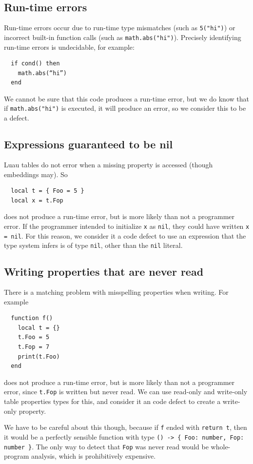 \documentclass[sigplan]{acmart}
\begin{document}
\subsection{Run-time errors}

Run-time errors occur due to run-time type mismatches (such as \verb|5("hi")|)
or incorrect built-in function calls (such as \verb|math.abs("hi")|).
Precisely identifying run-time errors is undecidable, for example:
\begin{verbatim}
  if cond() then
    math.abs(“hi”)
  end
\end{verbatim}
We cannot be sure that this code produces a run-time
error, but we do know that if \verb|math.abs("hi")| is executed, it
will produce an error, so we consider this to be a defect.

\subsection{Expressions guaranteed to be nil}

Luau tables do not error when a missing property is accessed (though embeddings may). So
\begin{verbatim}
  local t = { Foo = 5 }
  local x = t.Fop
\end{verbatim}
does not produce a run-time error, but is more likely than not a
programmer error. If the programmer intended to
initialize \verb|x| as \verb|nil|, they could have written
\verb|x = nil|.  For this reason, we consider it a code defect to use
an expression that the type system infers is of type \verb|nil|, other
than the \verb|nil| literal.

\subsection{Writing properties that are never read}

There is a matching problem with misspelling properties when writing. For example
\begin{verbatim}
  function f()
    local t = {}
    t.Foo = 5
    t.Fop = 7
    print(t.Foo)
  end
\end{verbatim}
does not produce a run-time error, but is more likely than not a
programmer error, since \verb|t.Fop| is written but never read. We can use
read-only and write-only table properties types for this, and consider it an
code defect to create a write-only property.

We have to be careful about this though, because if \verb|f| ended
with \verb|return t|, then it would be a perfectly sensible function
with type \verb|() -> { Foo: number, Fop: number }|. The only way to detect
that \verb|Fop| was never read would be whole-program analysis, which is
prohibitively expensive.
\end{document}
